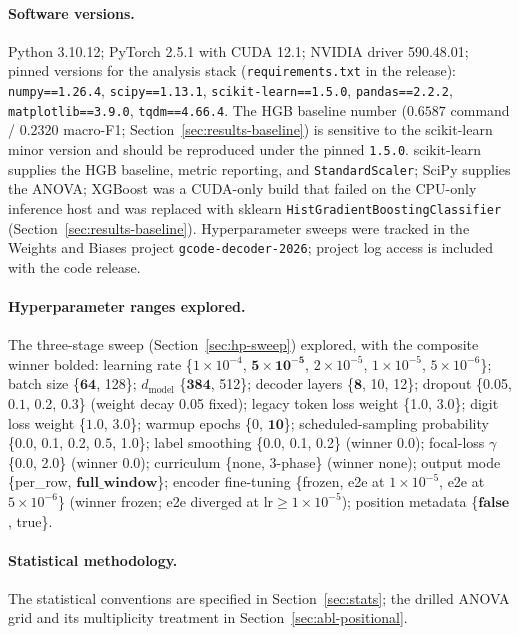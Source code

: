 \documentclass[sensors,article,submit,moreauthors,pdftex]{Definitions/mdpi}
\begin{document}
\paragraph{Software versions.}
\label{app3:repro-software}
Python 3.10.12; PyTorch 2.5.1 with CUDA 12.1; NVIDIA driver 590.48.01; pinned versions for the analysis stack
(\texttt{requirements.txt} in the release): \texttt{numpy==1.26.4}, \texttt{scipy==1.13.1},
\texttt{scikit-learn==1.5.0}, \texttt{pandas==2.2.2}, \texttt{matplotlib==3.9.0}, \texttt{tqdm==4.66.4}. The
HGB baseline number ($0.6587$ command / $0.2320$ macro-F1; Section~\ref{sec:results-baseline}) is sensitive to
the scikit-learn minor version and should be reproduced under the pinned \texttt{1.5.0}. scikit-learn supplies
the HGB baseline, metric reporting, and \texttt{StandardScaler}; SciPy supplies the ANOVA; XGBoost was a
CUDA-only build that failed on the CPU-only inference host and was replaced with sklearn
\texttt{HistGradientBoostingClassifier} (Section~\ref{sec:results-baseline}). Hyperparameter sweeps were
tracked in the Weights and Biases project \texttt{gcode-decoder-2026}; project log access is included with the
code release.

\paragraph{Hyperparameter ranges explored.}
\label{app3:repro-hp}
The three-stage sweep (Section~\ref{sec:hp-sweep}) explored, with the composite winner bolded: learning rate \{$1\!\times\!10^{-4}$, $\mathbf{5\!\times\!10^{-5}}$, $2\!\times\!10^{-5}$, $1\!\times\!10^{-5}$, $5\!\times\!10^{-6}$\}; batch size \{$\mathbf{64}$, 128\}; $d_{\text{model}}$ \{$\mathbf{384}$, 512\}; decoder layers \{$\mathbf{8}$, 10, 12\}; dropout \{0.05, $\mathbf{0.1}$, 0.2, 0.3\} (weight decay 0.05 fixed); legacy token loss weight \{1.0, $\mathbf{3.0}$\}; digit loss weight \{$\mathbf{1.0}$, 3.0\}; warmup epochs \{0, $\mathbf{10}$\}; scheduled-sampling probability \{0.0, 0.1, 0.2, $\mathbf{0.5}$, 1.0\}; label smoothing \{0.0, 0.1, 0.2\} (winner 0.0); focal-loss $\gamma$ \{0.0, 2.0\} (winner 0.0); curriculum \{none, 3-phase\} (winner none); output mode \{per\_row, $\mathbf{full\_window}$\}; encoder fine-tuning \{frozen, e2e at $1\!\times\!10^{-5}$, e2e at $5\!\times\!10^{-6}$\} (winner frozen; e2e diverged at lr$\ge\!1\!\times\!10^{-5}$); position metadata \{$\mathbf{false}$, true\}.

\paragraph{Statistical methodology.}
\label{app3:repro-stats}
The statistical conventions are specified in Section~\ref{sec:stats}; the drilled ANOVA grid and its multiplicity treatment in Section~\ref{sec:abl-positional}.
\end{document}

